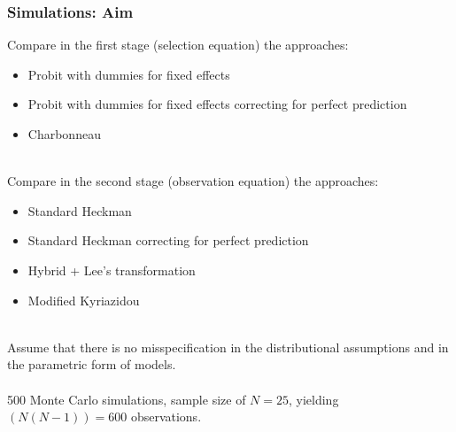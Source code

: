 \begin{frame}
    \frametitle{Simulations: Aim}
    Compare in the first stage (selection equation) the approaches:
    \begin{itemize}
        \item Probit with dummies for fixed effects
        \item Probit with dummies for fixed effects correcting for perfect prediction 
        \item Charbonneau \\~\\ 
    \end{itemize}
    Compare in the second stage (observation equation) the approaches:
    \begin{itemize}
        \item Standard Heckman 
        \item Standard Heckman correcting for perfect prediction 
        \item Hybrid + Lee's transformation
        \item Modified Kyriazidou \\~\\ 
    \end{itemize}
    Assume that there is no misspecification in the distributional assumptions and in the parametric form of models. 
    \\~\\ 
    500 Monte Carlo simulations, sample size of $N=25$, yielding $(N(N-1))=600$ observations.
\end{frame}

